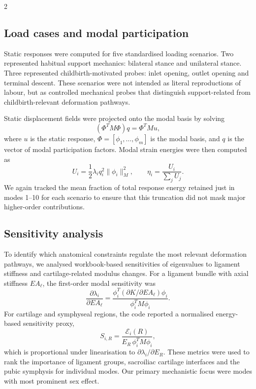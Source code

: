 \documentclass[openacc]{rsproca_new}
\begin{document}
\begin{multicols}{2}
\subsection{Load cases and modal participation}

Static responses were computed for five standardised loading scenarios. Two represented habitual support mechanics: bilateral stance and unilateral stance. Three represented childbirth-motivated probes: inlet opening, outlet opening and terminal descent. These scenarios were not intended as literal reproductions of labour, but as controlled mechanical probes that distinguish support-related from childbirth-relevant deformation pathways.

Static displacement fields were projected onto the modal basis by solving
\begin{equation}
(\Phi^{T}M\Phi)q = \Phi^{T}Mu,
\end{equation}
where $u$ is the static response, $\Phi=[\phi_{1},\ldots,\phi_{m}]$ is the modal basis, and $q$ is the vector of modal participation factors. Modal strain energies were then computed as
\begin{equation}
U_{i}=\frac{1}{2}\lambda_{i}q_{i}^{2}\lVert\phi_{i}\rVert_{M}^{2}, \qquad
\eta_{i}=\frac{U_{i}}{\sum_{j}U_{j}}.
\end{equation}
We again tracked the mean fraction of total response energy retained just in modes 1–10 for each scenario to ensure that this truncation did not mask major higher-order contributions.


\subsection{Sensitivity analysis}

To identify which anatomical constraints regulate the most relevant deformation pathways, we analysed workbook-based sensitivities of eigenvalues to ligament stiffness and cartilage-related modulus changes. For a ligament bundle with axial stiffness $EA_{\ell}$, the first-order modal sensitivity was
\begin{equation}
\frac{\partial \lambda_{i}}{\partial EA_{\ell}}
=
\frac{\phi_{i}^{T}(\partial K/\partial EA_{\ell})\phi_{i}}
{\phi_{i}^{T}M\phi_{i}}.
\end{equation}
For cartilage and symphyseal regions, the code reported a normalised energy-based sensitivity proxy,
\begin{equation}
S_{i,R}=\frac{\mathcal{E}_{i}(R)}{E_{R}\,\phi_{i}^{T}M\phi_{i}},
\end{equation}
which is proportional under linearisation to $\partial \lambda_{i}/\partial E_{R}$. These metrics were used to rank the importance of ligament groups, sacroiliac cartilage interfaces and the pubic symphysis for individual modes. Our primary mechanistic focus were modes with most prominent sex effect.


\end{multicols}
\end{document}

